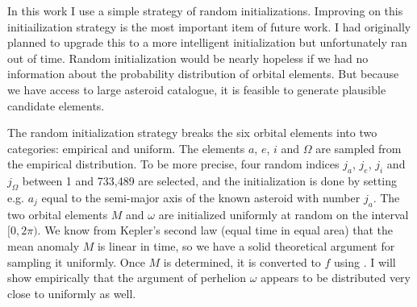 In this work I use a simple strategy of random initializations.
Improving on this initiailization strategy is the most important item of future work.
I had originally planned to upgrade this to a more intelligent initialization but unfortunately ran out of time.
Random initialization would be nearly hopeless if we had no information about the probability distribution of orbital elements.
But because we have access to large asteroid catalogue, it is feasible to generate plausible candidate elements.

The random initialization strategy breaks the six orbital elements into two categories: empirical and uniform.
The elements $a$, $e$, $i$ and $\Omega$ are sampled from the empirical distribution.
To be more precise, four random indices $j_{a}$, $j_{e}$, $j_{i}$ and $j_{\Omega}$ between 1 and 733,489 are selected, 
and the initialization is done by setting e.g. $a_{j}$ equal to the semi-major axis of the known asteroid with number $j_{a}$.
The two orbital elements $M$ and $\omega$ are initialized uniformly at random on the interval $[0, 2\pi)$.
We know from Kepler's second law (equal time in equal area) that the mean anomaly $M$ is linear in time,
so we have a solid theoretical argument for sampling it uniformly.
Once $M$ is determined, it is converted to $f$ using .
I will show empirically that the argument of perhelion $\omega$ appears to be distributed very close to uniformly as well.

